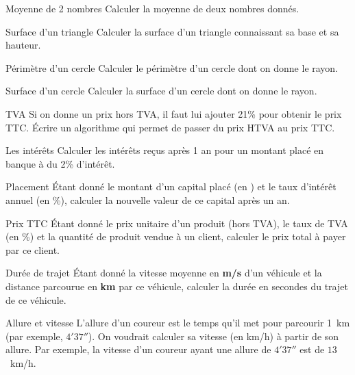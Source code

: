 		\begin{Exercice}{Moyenne de 2 nombres}
			Calculer la moyenne de deux nombres donnés.
		\end{Exercice}
		
		\begin{Exercice}{Surface d’un triangle}
			Calculer la surface d’un triangle connaissant sa base et sa hauteur.
		\end{Exercice}
	
		\begin{Exercice}{Périmètre d’un cercle}
			Calculer le périmètre d’un cercle dont on donne le rayon. 
		\end{Exercice}
	
		\begin{Exercice}{Surface d’un cercle}
			Calculer la surface d’un cercle dont on donne le rayon. 
		\end{Exercice}
	
		\begin{Exercice}{TVA}
			Si on donne un prix hors TVA, il faut lui ajouter 21\% 
			pour obtenir le prix TTC. Écrire un algorithme qui permet 
			de passer du prix HTVA au prix TTC.
		\end{Exercice}
	
		\begin{Exercice}{Les intérêts}
			Calculer les intérêts reçus après 1 an pour un montant placé en 
			banque à du 2\% d’intérêt.
		\end{Exercice}
	
		\begin{Exercice}{Placement}
			Étant donné le montant d’un capital placé (en \texteuro) 
			et le taux d’intérêt annuel (en \%), 
			calculer la nouvelle valeur de ce capital après un an.
		\end{Exercice}
	
		\begin{Exercice}{Prix TTC}
			Étant donné le prix unitaire d’un produit
			(hors TVA), le taux de TVA (en \%) et la quantité de produit vendue à
			un client, calculer le prix total à payer par ce client.
		\end{Exercice}
	
		\begin{Exercice}{Durée de trajet}
			Étant donné la vitesse moyenne en \textbf{m/s}
			d’un véhicule et la distance parcourue en \textbf{km} par ce véhicule,
			calculer la durée en secondes du trajet de ce véhicule.
		\end{Exercice}
	
		\begin{Exercice}{Allure et vitesse}
			L’allure d’un coureur est le temps qu’il met pour parcourir 1~km
			(par exemple, $4'37''$).
			On voudrait calculer sa vitesse (en km/h) à partir de son allure.
			Par exemple, la vitesse d’un coureur ayant une allure de
			$4'37''$ est de $13$~km/h. 
		\end{Exercice}
	
